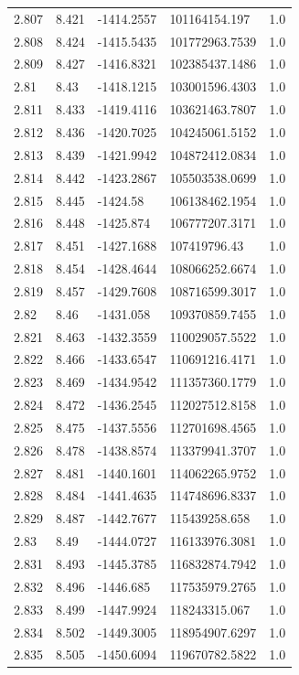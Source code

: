 \begin{tabular}{lllll}
2.807 & 8.421 & -1414.2557 & 101164154.197 & 1.0 \\
2.808 & 8.424 & -1415.5435 & 101772963.7539 & 1.0 \\
2.809 & 8.427 & -1416.8321 & 102385437.1486 & 1.0 \\
2.81 & 8.43 & -1418.1215 & 103001596.4303 & 1.0 \\
2.811 & 8.433 & -1419.4116 & 103621463.7807 & 1.0 \\
2.812 & 8.436 & -1420.7025 & 104245061.5152 & 1.0 \\
2.813 & 8.439 & -1421.9942 & 104872412.0834 & 1.0 \\
2.814 & 8.442 & -1423.2867 & 105503538.0699 & 1.0 \\
2.815 & 8.445 & -1424.58 & 106138462.1954 & 1.0 \\
2.816 & 8.448 & -1425.874 & 106777207.3171 & 1.0 \\
2.817 & 8.451 & -1427.1688 & 107419796.43 & 1.0 \\
2.818 & 8.454 & -1428.4644 & 108066252.6674 & 1.0 \\
2.819 & 8.457 & -1429.7608 & 108716599.3017 & 1.0 \\
2.82 & 8.46 & -1431.058 & 109370859.7455 & 1.0 \\
2.821 & 8.463 & -1432.3559 & 110029057.5522 & 1.0 \\
2.822 & 8.466 & -1433.6547 & 110691216.4171 & 1.0 \\
2.823 & 8.469 & -1434.9542 & 111357360.1779 & 1.0 \\
2.824 & 8.472 & -1436.2545 & 112027512.8158 & 1.0 \\
2.825 & 8.475 & -1437.5556 & 112701698.4565 & 1.0 \\
2.826 & 8.478 & -1438.8574 & 113379941.3707 & 1.0 \\
2.827 & 8.481 & -1440.1601 & 114062265.9752 & 1.0 \\
2.828 & 8.484 & -1441.4635 & 114748696.8337 & 1.0 \\
2.829 & 8.487 & -1442.7677 & 115439258.658 & 1.0 \\
2.83 & 8.49 & -1444.0727 & 116133976.3081 & 1.0 \\
2.831 & 8.493 & -1445.3785 & 116832874.7942 & 1.0 \\
2.832 & 8.496 & -1446.685 & 117535979.2765 & 1.0 \\
2.833 & 8.499 & -1447.9924 & 118243315.067 & 1.0 \\
2.834 & 8.502 & -1449.3005 & 118954907.6297 & 1.0 \\
2.835 & 8.505 & -1450.6094 & 119670782.5822 & 1.0 \\

\end{tabular}

